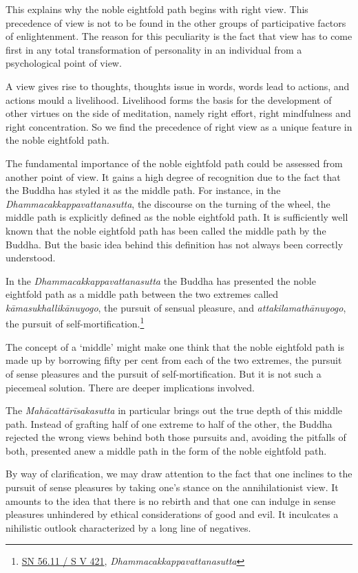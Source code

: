 This explains why the noble eightfold path begins with right view. This precedence of view is not to be found in the other groups of participative factors of enlightenment. The reason for this peculiarity is the fact that view has to come first in any total transformation of personality in an individual from a psychological point of view.

\enlargethispage{\baselineskip}

A view gives rise to thoughts, thoughts issue in words, words lead to actions, and actions mould a livelihood. Livelihood forms the basis for the development of other virtues on the side of meditation, namely right effort, right mindfulness and right concentration. So we find the precedence of right view as a unique feature in the noble eightfold path.

The fundamental importance of the noble eightfold path could be assessed from another point of view. It gains a high degree of recognition due to the fact that the Buddha has styled it as the middle path. For instance, in the \emph{Dhammacakkappavattanasutta}, the discourse on the turning of the wheel, the middle path is explicitly defined as the noble eightfold path. It is sufficiently well known that the noble eightfold path has been called the middle path by the Buddha. But the basic idea behind this definition has not always been correctly understood.

In the \emph{Dhammacakkappavattanasutta} the Buddha has presented the noble eightfold path as a middle path between the two extremes called \emph{kāmasukhallikānuyogo}, the pursuit of sensual pleasure, and \emph{attakilamathānuyogo}, the pursuit of self-mortification.\footnote{\href{https://suttacentral.net/sn56.11/pli/ms}{SN 56.11 / S V 421}, \emph{Dhammacakkappavattanasutta}}

The concept of a `middle' might make one think that the noble eightfold path is made up by borrowing fifty per cent from each of the two extremes, the pursuit of sense pleasures and the pursuit of self-mortification. But it is not such a piecemeal solution. There are deeper implications involved.

The \emph{Mahācattārīsakasutta} in particular brings out the true depth of this middle path. Instead of grafting half of one extreme to half of the other, the Buddha rejected the wrong views behind both those pursuits and, avoiding the pitfalls of both, presented anew a middle path in the form of the noble eightfold path.

By way of clarification, we may draw attention to the fact that one inclines to the pursuit of sense pleasures by taking one's stance on the annihilationist view. It amounts to the idea that there is no rebirth and that one can indulge in sense pleasures unhindered by ethical considerations of good and evil. It inculcates a nihilistic outlook characterized by a long line of negatives.

